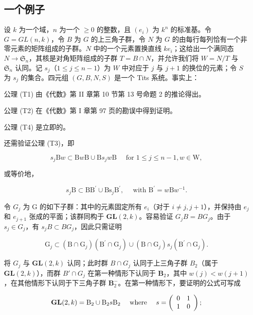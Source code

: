 \subsection{一个例子}

设 \(k\) 为一个域，\(n\) 为一个 \(\geqslant 0\) 的整数，且 \((e_i)\) 为 \(k^n\) 的标准基。令 \(G = GL(n, k)\)，令 \(B\) 为 \(G\) 的上三角子群，令 \(N\) 为 \(G\) 的由每行每列恰有一个非零元素的矩阵组成的子群。\(N\) 中的一个元素置换直线 \(ke_i\)；这给出一个满同态 \(N \to \mathfrak{S}_n\)，其核是对角矩阵组成的子群 \(T = B \cap N\)，并允许我们将 \(W = N/T\) 与 \(\mathfrak{S}_n\) 认同。记 \(s_j\)（\(1 \leqslant j \leqslant n - 1\)）为 \(W\) 中对应于 \(j\) 与 \(j + 1\) 的换位的元素；令 \(S\) 为 \(s_j\) 的集合。四元组 \((G, B, N, S)\) 是一个 Tits 系统。事实上：

公理 (T1) 由《代数》第 II 章第 10 节第 13 号命题 2 的推论得出。

公理 (T2) 在《代数》第 I 章第 97 页的勘误中得到证明。

公理 (T4) 是立即的。

还需验证公理 (T3)，即

\[
s _ {j} \mathrm{B} w \subset \mathrm{B} w \mathrm{B} \cup \mathrm{B} s _ {j} w \mathrm{B} \quad \text { for } 1 \leqslant j \leqslant n - 1, w \in \mathrm{W},
\]

或等价地，

\[
s _ {j} \mathrm{B} \subset \mathrm{BB} ^ {\prime} \cup \mathrm{Bs} _ {j} \mathrm{B} ^ {\prime}, \quad \text { with } \mathrm{B} ^ {\prime} = w \mathrm{B} w ^ {- 1}.
\]

令 \(G_{j}\) 为 G 的如下子群：其中的元素固定所有 \(e_{i}\)（对于 \(i \neq j, j + 1\)），并保持由 \(e_{j}\) 和 \(e_{j+1}\) 张成的平面；该群同构于 \(\mathbf{GL}(2, k)\)。容易验证 \(G_{j}B = BG_{j}\)。由于 \(s_{j} \in G_{j}\)，有 \(s_{j}B \subset BG_{j}\)，因此只需证明

\[
\mathrm{G} _ {j} \subset (\mathrm{B} \cap \mathrm{G} _ {j}) (\mathrm{B} ^ {\prime} \cap \mathrm{G} _ {j}) \cup (\mathrm{B} \cap \mathrm{G} _ {j}) s _ {j} (\mathrm{B} ^ {\prime} \cap \mathrm{G} _ {j}).
\]

将 \(G_{j}\) 与 \(\mathbf{GL}(2,k)\) 认同；此时群 \(B \cap G_{j}\) 认同于上三角子群 \(B_{2}\)（属于 \(\mathbf{GL}(2,k)\)），而群 \(B' \cap G_{j}\) 在第一种情形下认同于 \(\mathbf{B}_2\)，其中 \(w(j) < w(j + 1)\)，在其他情形下认同于下三角子群 \(\mathbf{B}_2^-\)。在第一种情形下，要证明的公式可写成

\[
\mathbf {G L} (2, k) = \mathrm{B} _ {2} \cup \mathrm{B} _ {2} s \mathrm{B} _ {2} \quad \text { where } \quad s = \left( \begin{array}{c c} 0 & 1 \\ 1 & 0 \end{array} \right);
\]

